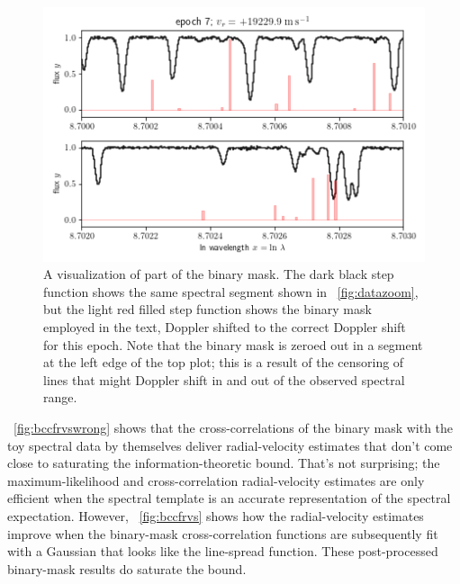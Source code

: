 \documentclass[modern]{aastex631}
\newcommand{\figref}[1]{\figurename~\ref{#1}}
\begin{document}
\begin{figure}[tp]
  \begin{mdframed}
    \begin{center}
    \includegraphics[width=\textwidth]{../notebook/binarymask.png}
    \end{center}
    \caption{A visualization of part of the binary mask. The dark black step function shows the same spectral segment shown in \figref{fig:datazoom}, but the light red filled step function shows the binary mask employed in the text, Doppler shifted to the correct Doppler shift for this epoch. Note that the binary mask is zeroed out in a segment at the left edge of the top plot; this is a result of the censoring of lines that might Doppler shift in and out of the observed spectral range.\label{fig:binarymask}}
  \end{mdframed}
\end{figure}

\figref{fig:bccfrvswrong} shows that the cross-correlations of the binary mask with the toy spectral data by themselves deliver radial-velocity estimates that don't come close to saturating the information-theoretic bound.
That's not surprising; the maximum-likelihood and cross-correlation radial-velocity estimates are only efficient when the spectral template is an accurate representation of the spectral expectation.
However, \figref{fig:bccfrvs} shows how the radial-velocity estimates improve when the binary-mask cross-correlation functions are subsequently fit with a Gaussian that looks like the line-spread function.
These post-processed binary-mask results do saturate the bound.
\end{document}
